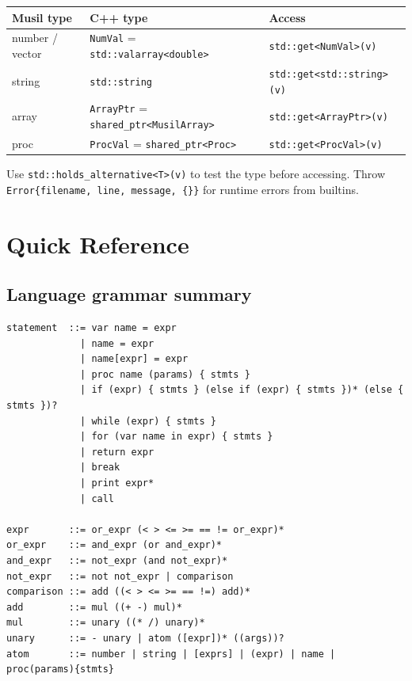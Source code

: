 \documentclass[11pt,a4paper]{article}
\begin{document}
\begin{center}
\begin{tabular}{@{}lll@{}}
\toprule
\textbf{Musil type} & \textbf{C++ type} & \textbf{Access} \\
\midrule
number / vector  & \texttt{NumVal} = \texttt{std::valarray<double>} & \texttt{std::get<NumVal>(v)} \\
string           & \texttt{std::string}                              & \texttt{std::get<std::string>(v)} \\
array            & \texttt{ArrayPtr} = \texttt{shared\_ptr<MusilArray>} & \texttt{std::get<ArrayPtr>(v)} \\
proc             & \texttt{ProcVal} = \texttt{shared\_ptr<Proc>}    & \texttt{std::get<ProcVal>(v)} \\
\bottomrule
\end{tabular}
\end{center}

Use \texttt{std::holds\_alternative<T>(v)} to test the type before accessing.
Throw \texttt{Error\{filename, line, message, \{\}\}} for runtime errors from
builtins.

\section{Quick Reference}
\label{sec:quickref}

\subsection*{Language grammar summary}

\begin{lstlisting}[numbers=none]
statement  ::= var name = expr
             | name = expr
             | name[expr] = expr
             | proc name (params) { stmts }
             | if (expr) { stmts } (else if (expr) { stmts })* (else { stmts })?
             | while (expr) { stmts }
             | for (var name in expr) { stmts }
             | return expr
             | break
             | print expr*
             | call

expr       ::= or_expr (< > <= >= == != or_expr)*
or_expr    ::= and_expr (or and_expr)*
and_expr   ::= not_expr (and not_expr)*
not_expr   ::= not not_expr | comparison
comparison ::= add ((< > <= >= == !=) add)*
add        ::= mul ((+ -) mul)*
mul        ::= unary ((* /) unary)*
unary      ::= - unary | atom ([expr])* ((args))?
atom       ::= number | string | [exprs] | (expr) | name | proc(params){stmts}
\end{lstlisting}
\end{document}
